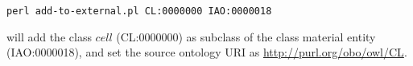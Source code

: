 \documentclass[a4paper,10pt,twocolumn]{article}
\begin{document}
\begin{footnotesize}
\begin{verbatim}
perl add-to-external.pl CL:0000000 IAO:0000018
\end{verbatim}
\end{footnotesize}

will add the class $cell$ (CL:0000000) as subclass of the class material entity (IAO:0000018), and set the source ontology URI as \url{http://purl.org/obo/owl/CL}.















\end{document}
